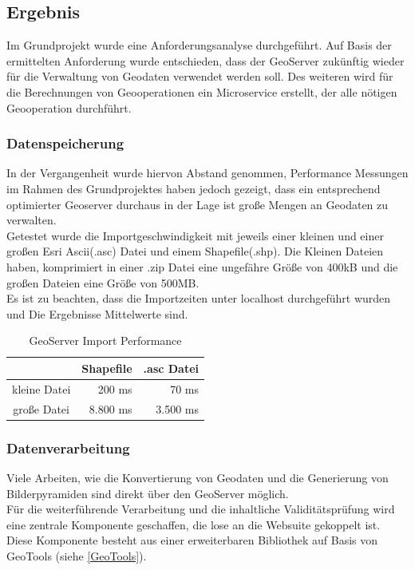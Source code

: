 \documentclass[10pt,conference,compsocconf]{IEEEtran}
\begin{document}
\subsection{Ergebnis}
Im Grundprojekt wurde eine Anforderungsanalyse durchgeführt. Auf Basis der ermittelten Anforderung wurde entschieden, dass der GeoServer zukünftig wieder für die Verwaltung von Geodaten verwendet werden soll. Des weiteren wird für die Berechnungen von Geooperationen ein Microservice erstellt, der alle nötigen Geooperation durchführt.

\subsubsection{Datenspeicherung}
In der Vergangenheit wurde hiervon Abstand genommen, Performance Messungen im Rahmen des Grundprojektes haben jedoch gezeigt, dass ein entsprechend optimierter Geoserver durchaus in der Lage ist große Mengen an Geodaten zu verwalten.\\
Getestet wurde die Importgeschwindigkeit mit jeweils einer kleinen und einer großen Esri Ascii(.asc) Datei und einem Shapefile(.shp). Die Kleinen Dateien haben, komprimiert in einer .zip Datei eine ungefähre Größe von 400kB und die großen Dateien eine Größe von 500MB.\\
Es ist zu beachten, dass die Importzeiten unter localhost durchgeführt wurden und Die Ergebnisse Mittelwerte sind.\\
\begin{table}[H]
	{\tabulinesep=2mm
	\begin{center}\begin{tabu}{ |c|r|r| }
		\hline
		& \textbf{Shapefile} & \textbf{.asc Datei} \\ \hline
		kleine Datei & 200 ms & 70 ms \\ \hline
		große Datei & 8.800 ms & 3.500 ms \\ \hline
	\end{tabu}\end{center}}
	\caption{GeoServer Import Performance}
\end{table}

\subsubsection{Datenverarbeitung}
Viele Arbeiten, wie die Konvertierung von Geodaten und die Generierung von Bilderpyramiden sind direkt über den GeoServer möglich.\\
Für die weiterführende Verarbeitung und die inhaltliche Validitätsprüfung wird eine zentrale Komponente geschaffen, die lose an die Websuite gekoppelt ist. Diese Komponente besteht aus einer erweiterbaren Bibliothek auf Basis von GeoTools (siehe \ref{GeoTools}).\\
\end{document}
